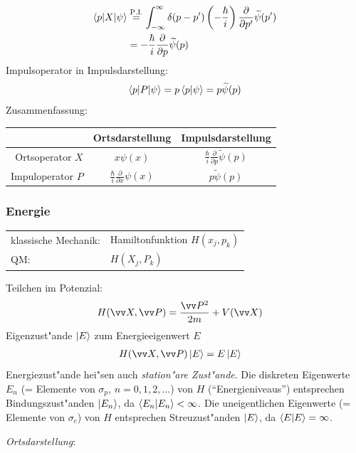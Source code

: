 \documentclass[a4paper]{scrartcl}
\begin{document}
{\begin{align}
\begin{split}
\braket{ p | X | \psi} & \stackrel{\mathrm{P.I.}}= \int_{-\infty}^\infty \delta(p-p') \left( - \frac \hbar i \right) \frac \partial {\partial p'} \widetilde \psi(p') \\
& = - \frac \hbar i \frac \partial {\partial p} \widetilde \psi (p)
\end{split}
\end{align}
Impulsoperator in Impulsdarstellung:
$$ \braket{ p | P | \psi} = p  \braket{ p| \psi} = p \widetilde \psi(p)$$
Zusammenfassung:
\begin{center}
\begin{tabular}{r | c  | c }
& Ortsdarstellung & Impulsdarstellung \\
\hline
Ortsoperator $X$ & $x \psi (x)$ & $\frac \hbar i \frac \partial {\partial p} \widetilde \psi(p)$ \\
Impuloperator $P$ & $\frac \hbar i \frac \partial {\partial x} \psi(x)$ & $p \widetilde \psi(p)$
\end{tabular}
\end{center}

\subsubsection*{Energie}
\begin{center}
\begin{tabular}{l l }
klassische Mechanik: & Hamiltonfunktion $H(x_j, p_k)$ \\
QM: & $H(X_j, P_k)$
\end{tabular}
\end{center}
Teilchen im Potenzial:
\begin{align}
H(\vv X, \vv P) & = \frac{ \vv P^2}{2m} + V(\vv X)
\end{align}
Eigenzust"ande $\ket E$ zum Energieeigenwert $E$
\begin{align}
H(\vv X, \vv P) \ket E & = E \ket E
\end{align}
Energiezust"ande hei"sen auch \emph{station"are Zust"ande}. Die diskreten Eigenwerte $E_n$ (= Elemente von $\sigma_p$, $n=0,1,2, \ldots$) von $H$ ("`Energieniveaus"') entsprechen Bindungszust"anden $\ket {E_n}$, da $\braket{ E_n | E_n} < \infty$. Die uneigentlichen Eigenwerte (= Elemente von $\sigma_c$) von $H$ entsprechen Streuzust"anden $\ket E$, da $\braket{ E | E } = \infty$.

\emph{Ortsdarstellung}: 

}
\end{document}
